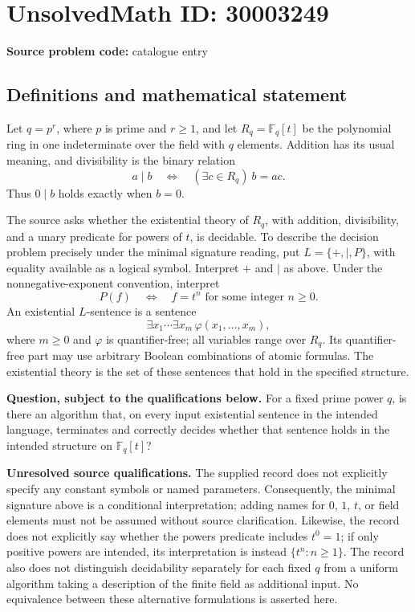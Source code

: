 \documentclass[11pt]{article}
\begin{document}
\section*{UnsolvedMath ID: 30003249}
\textbf{Source problem code:} catalogue entry
\subsection{Definitions and mathematical statement}
Let \(q=p^r\), where \(p\) is prime and \(r\geq 1\), and let \(R_q=\mathbb F_q[t]\) be the polynomial ring in one indeterminate over the field with \(q\) elements. Addition has its usual meaning, and divisibility is the binary relation
\[
a\mid b\quad\Longleftrightarrow\quad (\exists c\in R_q)\ b=ac.
\]
Thus \(0\mid b\) holds exactly when \(b=0\).

The source asks whether the existential theory of \(R_q\), with addition, divisibility, and a unary predicate for powers of \(t\), is decidable. To describe the decision problem precisely under the minimal signature reading, put \(L=\{+,\mid,P\}\), with equality available as a logical symbol. Interpret \(+\) and \(\mid\) as above. Under the nonnegative-exponent convention, interpret
\[
P(f)\quad\Longleftrightarrow\quad f=t^n\text{ for some integer }n\geq 0.
\]
An existential \(L\)-sentence is a sentence
\[
\exists x_1\cdots\exists x_m\,\varphi(x_1,\ldots,x_m),
\]
where \(m\geq 0\) and \(\varphi\) is quantifier-free; all variables range over \(R_q\). Its quantifier-free part may use arbitrary Boolean combinations of atomic formulas. The existential theory is the set of these sentences that hold in the specified structure.

\textbf{Question, subject to the qualifications below.} For a fixed prime power \(q\), is there an algorithm that, on every input existential sentence in the intended language, terminates and correctly decides whether that sentence holds in the intended structure on \(\mathbb F_q[t]\)?

\textbf{Unresolved source qualifications.} The supplied record does not explicitly specify any constant symbols or named parameters. Consequently, the minimal signature above is a conditional interpretation; adding names for \(0\), \(1\), \(t\), or field elements must not be assumed without source clarification. Likewise, the record does not explicitly say whether the powers predicate includes \(t^0=1\); if only positive powers are intended, its interpretation is instead \(\{t^n:n\geq 1\}\). The record also does not distinguish decidability separately for each fixed \(q\) from a uniform algorithm taking a description of the finite field as additional input. No equivalence between these alternative formulations is asserted here.
\end{document}

